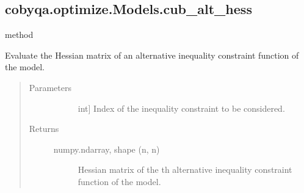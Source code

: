 \documentclass[letterpaper,10pt,english]{sphinxmanual}
\begin{document}
\begin{fulllineitems}
\begin{fulllineitems}
\begin{quote}
\begin{description}
\end{description}\end{quote}

\end{fulllineitems}



\subsection{cobyqa.optimize.Models.cub\_alt\_hess}
\label{\detokenize{refs/generated/cobyqa.optimize.Models.cub_alt_hess:cobyqa-optimize-models-cub-alt-hess}}\label{\detokenize{refs/generated/cobyqa.optimize.Models.cub_alt_hess::doc}}
\sphinxAtStartPar
method

\begin{fulllineitems}
\label{\detokenize{refs/generated/cobyqa.optimize.Models.cub_alt_hess:cobyqa.optimize.Models.cub_alt_hess}}
\sphinxAtStartPar
Evaluate the Hessian matrix of an alternative inequality constraint
function of the model.
\begin{quote}\begin{description}
\item[{Parameters}] \leavevmode\begin{description}
\item[{}] \leavevmode{[}int{]}
\sphinxAtStartPar
Index of the inequality constraint to be considered.

\end{description}

\item[{Returns}] \leavevmode\begin{description}
\item[{numpy.ndarray, shape (n, n)}] \leavevmode
\sphinxAtStartPar
Hessian matrix of the \sphinxhyphen{}th alternative inequality constraint
function of the model.

\end{description}

\end{description}\end{quote}

\end{fulllineitems}




\end{fulllineitems}
\end{document}
